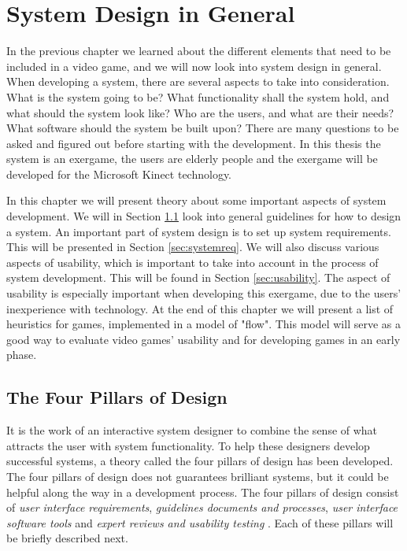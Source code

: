 \chapter{System Design in General}
\label{chap:generalsystemdesign}
In the previous chapter we learned about the different elements that need to be included in a video game, and we will now look into system design in general. When developing a system, there are several aspects to take into consideration. What is the system going to be? What functionality shall the system hold, and what should the system look like? Who are the users, and what are their needs? What software should the system be built upon? There are many questions to be asked and figured out before starting with the development. In this thesis the system is an exergame, the users are elderly people and the exergame will be developed for the Microsoft Kinect technology.

In this chapter we will present theory about some important aspects of system development. We will in Section \ref{sec:fourpillarsofdesign} look into general guidelines for how to design a system. An important part of system design is to set up system requirements. This will be presented in Section \ref{sec:systemreq}. We will also discuss various aspects of usability, which is important to take into account in the process of system development. This will be found in Section \ref{sec:usability}. The aspect of usability is especially important when developing this exergame, due to the users' inexperience with technology.  At the end of this chapter we will present a list of heuristics for games, implemented in a model of "flow". This model will serve as a good way to evaluate video games' usability and for developing games in an early phase.

\section{The Four Pillars of Design}
\label{sec:fourpillarsofdesign}
It is the work of an interactive system designer to combine the sense of what attracts the user with system functionality. To help these designers develop successful systems, a theory called the four pillars of design has been developed. The four pillars of design does not guarantees brilliant systems, but it could be helpful along the way in a development process. The four pillars of design consist of \emph{user interface requirements}, \emph{guidelines documents and processes}, \emph{user interface software tools} and \emph{expert reviews and usability testing} \cite{mmi}. Each of these pillars will be briefly described next. 

